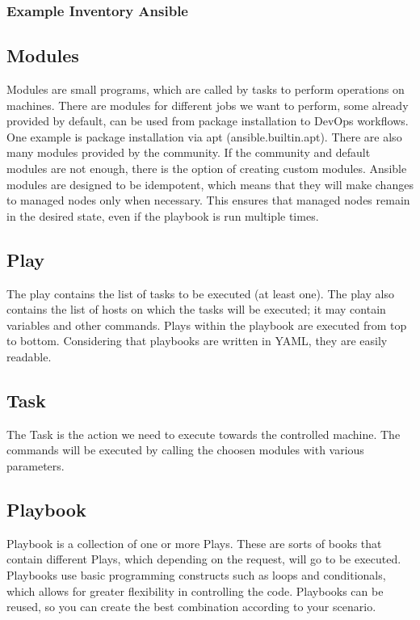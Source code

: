 \documentclass[12pt,a4paper,openright,twoside]{book}
\begin{document}
\subsubsection{Example Inventory Ansible}



\subsection{Modules}
Modules are small programs, which are called by tasks to perform operations on machines.
There are modules for different jobs we want to perform, some already provided by default, can be used from package installation to DevOps workflows.
One example is package installation via apt (ansible.builtin.apt).
There are also many modules provided by the community. If the community and default modules are not enough, there is the option of creating custom modules\cite{ansibleDocNewModules}.
Ansible modules are designed to be idempotent, which means that they will make changes to managed nodes only when necessary. This ensures that managed nodes remain in the desired state, even if the playbook is run multiple times.

\subsection{Play}
The play contains the list of tasks to be executed (at least one). The play also contains the list of hosts on which the tasks will be executed; it may contain variables and other commands.
Plays within the playbook are executed from top to bottom. Considering that playbooks are written in YAML, they are easily readable.

\subsection{Task}
The Task is the action we need to execute towards the controlled machine. The commands will be executed by calling the choosen modules with various parameters.

\subsection{Playbook}
Playbook is a collection of one or more Plays.
These are sorts of books that contain different Plays, which depending on the request, will go to be executed. Playbooks use basic programming constructs such as loops and conditionals, which allows for greater flexibility in controlling the code.
Playbooks can be reused, so you can create the best combination according to your scenario.
\end{document}
